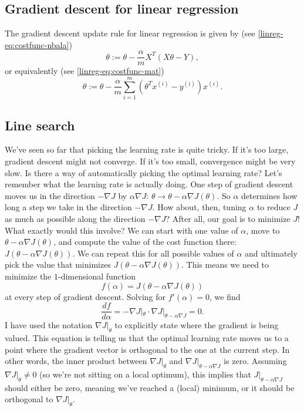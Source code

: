 \documentclass{article}
\theoremstyle{definition}
\begin{document}
\subsection{Gradient descent for linear regression}
The gradient descent update rule for linear regression is given by (see \eqref{linreg-eq:costfunc-nbala})
\begin{equation}
    \theta := \theta - \frac{\alpha}{m}X^T(X\theta - Y),
\end{equation}
or equivalently (see \eqref{linreg-eq:costfunc-mat})
\begin{equation}
    \theta := \theta - \frac{\alpha}{m}\sum_{i=1}^{m}(\theta^Tx^{(i)} - y^{(i)})x^{(i)}.
\end{equation}


\subsection{Line search}
We've seen so far that picking the learning rate is quite tricky. If it's too large, gradient descent might not converge. If it's too small, convergence might be very slow. Is there a way of automatically picking the optimal learning rate? Let's remember what the learning rate is actually doing. One step of gradient descent moves us in the direction $-\nabla J$ by $\alpha\nabla J$: $\theta \to \theta - \alpha \nabla J(\theta)$. So $\alpha$ determines how long a step we take in the direction $-\nabla J$. How about, then, tuning $\alpha$ to reduce $J$ as much as possible along the direction $-\nabla J$? After all, our goal is to minimize $J$! What exactly would this involve? We can start with one value of $\alpha$, move to $\theta - \alpha \nabla J(\theta)$, and compute the value of the cost function there: $J(\theta - \alpha \nabla J(\theta))$. We can repeat this for all possible values of $\alpha$ and ultimately pick the value that minimizes $J(\theta - \alpha \nabla J(\theta))$. This means we need to minimize the $1$-dimensional function
\begin{equation}
    f(\alpha) = J(\theta - \alpha \nabla J(\theta))
\end{equation}
at every step of gradient descent. Solving for $f'(\alpha)=0$, we find
\begin{equation}
    \frac{df}{d\alpha} =-\nabla J|_{\theta}\cdot \nabla J|_{\theta - \alpha \nabla J} = 0.
    \label{graddes-eq:opt1}
\end{equation}
I have used the notation $\nabla J|_{\theta}$ to explicitly state where the gradient is being valued. This equation is telling us that the optimal learning rate moves us to a point where the gradient vector is  orthogonal to the one at the current step. In other words, the inner product between $\nabla J|_{\theta}$ and $\nabla J|_{\theta - \alpha \nabla J}$ is zero. Assuming $\nabla J|_{\theta}\neq 0$ (so we're not sitting on a local optimum), this implies that $J|_{\theta - \alpha \nabla J}$ should either be zero, meaning we've reached a (local) minimum, or it should be orthogonal to $\nabla J|_{\theta}$.
\end{document}
